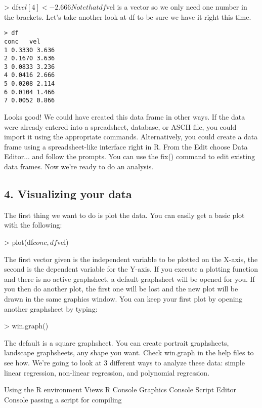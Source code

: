 \documentclass[a4paper,12pt]{article}
\begin{document}
> df$vel[4] <- 2.666
Note that df$vel is a vector so we only need one number in the brackets. Let's take another look at df to be sure we have it right this time. 
\begin{framed}
\begin{verbatim}
> df
conc   vel 
1 0.3330 3.636
2 0.1670 3.636
3 0.0833 3.236
4 0.0416 2.666
5 0.0208 2.114
6 0.0104 1.466
7 0.0052 0.866
\end{verbatim}
\end{framed}
Looks good! We could have created this data frame in other ways. If the data were already entered into a spreadsheet, database, or ASCII file, you could import it using the appropriate commands. Alternatively, you could create a data frame using a spreadsheet-like interface right in R. From the Edit choose Data Editor... and follow the prompts. You can use the fix() command to edit existing data frames. 
Now we're ready to do an analysis.

\subsection{4. Visualizing your data}


The first thing we want to do is plot the data. You can easily get a basic plot with the following:

> plot(df$conc, df$vel)

The first vector given is the independent variable to be plotted on the X-axis, the second is the dependent variable for the Y-axis. If you execute a plotting function and there is no active graphsheet, a default graphsheet will be opened for you. If you then do another plot, the first one will be lost and the new plot will be drawn in the 
same graphics window. You can keep your first plot by opening another graphsheet by typing: 

> win.graph()

The default is a square graphsheet. You can create portrait graphsheets, landscape graphsheets, any shape you want. Check win.graph in the help files to see how. 
We're going to look at 3 different ways to analyze these data: simple linear regression, non-linear regression, and polynomial regression. 


\newpage
Using the R environment
Views R Console
Graphics Console
Script Editor Console
passing a script for compiling
\end{document}
